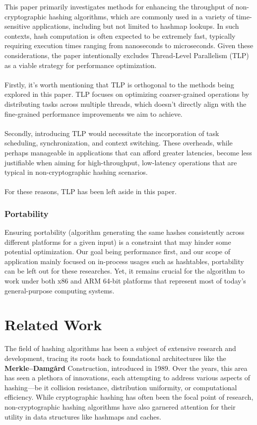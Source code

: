 \documentclass[10pt]{article}
\begin{document}
This paper primarily investigates methods for enhancing the throughput of non-cryptographic hashing algorithms, which are commonly used in a variety of time-sensitive applications, including but not limited to hashmap lookups.
In such contexts, hash computation is often expected to be extremely fast, typically requiring execution times ranging from nanoseconds to microseconds. Given these considerations, the paper intentionally excludes Thread-Level Parallelism
(TLP) as a viable strategy for performance optimization.\\\\
Firstly, it's worth mentioning that TLP is orthogonal to the methods being explored in this paper.
TLP focuses on optimizing coarser-grained operations by distributing tasks across multiple threads, which doesn't directly align with the fine-grained performance improvements we aim to achieve.\\\\
Secondly, introducing TLP would necessitate the incorporation of task scheduling, synchronization, and context switching.
These overheads, while perhaps manageable in applications that can afford greater latencies, become less justifiable when aiming for high-throughput, low-latency operations that are typical in non-cryptographic hashing scenarios.\\\\
For these reasons, TLP has been left aside in this paper.

\subsubsection{Portability}

Ensuring portability (algorithm generating the same hashes consistently across different platforms for a given input) is a constraint that may hinder some potential optimization. Our goal being performance first, and our scope of application mainly focused on in-process usages such as hashtables, portability can be left out for these researches. Yet, it remains crucial for the algorithm to work under both x86 and ARM 64-bit platforms that represent most of today's general-purpose computing systems.

\clearpage
\section{Related Work}

The field of hashing algorithms has been a subject of extensive research and development, tracing its roots back to foundational architectures like the \textbf{Merkle–Damgård} Construction\cite{merkle}\cite{damgard}, introduced in 1989. Over the years, this area has seen a plethora of innovations, each attempting to address various aspects of hashing—be it collision resistance, distribution uniformity, or computational efficiency. While cryptographic hashing has often been the focal point of research, non-cryptographic hashing algorithms have also garnered attention for their utility in data structures like hashmaps and caches.
\end{document}
